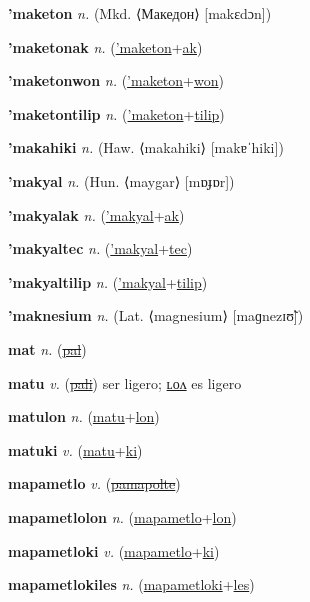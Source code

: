 \textbf{\hypertarget{'maketon}{'maketon}} \textit{n.} (Mkd. ⟨Македон⟩ [makɛdɔn])


\textbf{\hypertarget{'maketonak}{'maketonak}} \textit{n.} (\hyperlink{'maketon}{'maketon}+\allowbreak \hyperlink{ak}{ak})


\textbf{\hypertarget{'maketonwon}{'maketonwon}} \textit{n.} (\hyperlink{'maketon}{'maketon}+\allowbreak \hyperlink{won}{won})


\textbf{\hypertarget{'maketontilip}{'maketontilip}} \textit{n.} (\hyperlink{'maketon}{'maketon}+\allowbreak \hyperlink{tilip}{tilip})


\textbf{\hypertarget{'makahiki}{'makahiki}} \textit{n.} (Haw. ⟨makahiki⟩ [makɐˈhiki])


\textbf{\hypertarget{'makyal}{'makyal}} \textit{n.} (Hun. ⟨maygar⟩ [mɒɟɒr])


\textbf{\hypertarget{'makyalak}{'makyalak}} \textit{n.} (\hyperlink{'makyal}{'makyal}+\allowbreak \hyperlink{ak}{ak})


\textbf{\hypertarget{'makyaltec}{'makyaltec}} \textit{n.} (\hyperlink{'makyal}{'makyal}+\allowbreak \hyperlink{tec}{tec})


\textbf{\hypertarget{'makyaltilip}{'makyaltilip}} \textit{n.} (\hyperlink{'makyal}{'makyal}+\allowbreak \hyperlink{tilip}{tilip})


\textbf{\hypertarget{'maknesium}{'maknesium}} \textit{n.} (Lat. ⟨magnesium⟩ [maɡnezɪʊ̃])


\textbf{\hypertarget{mat}{mat}} \textit{n.} (\hyperlink{pal}{\sout{pal}})


\textbf{\hypertarget{matu}{matu}} \textit{v.} (\hyperlink{pali}{\sout{pali}})
ser ligero; \hyperlink{matulon}{ʟᴏᴧ} es ligero

\textbf{\hypertarget{matulon}{matulon}} \textit{n.} (\hyperlink{matu}{matu}+\allowbreak \hyperlink{lon}{lon})


\textbf{\hypertarget{matuki}{matuki}} \textit{v.} (\hyperlink{matu}{matu}+\allowbreak \hyperlink{ki}{ki})


\textbf{\hypertarget{mapametlo}{mapametlo}} \textit{v.} (\hyperlink{pamapolte}{\sout{pamapolte}})


\textbf{\hypertarget{mapametlolon}{mapametlolon}} \textit{n.} (\hyperlink{mapametlo}{mapametlo}+\allowbreak \hyperlink{lon}{lon})


\textbf{\hypertarget{mapametloki}{mapametloki}} \textit{v.} (\hyperlink{mapametlo}{mapametlo}+\allowbreak \hyperlink{ki}{ki})


\textbf{\hypertarget{mapametlokiles}{mapametlokiles}} \textit{n.} (\hyperlink{mapametloki}{mapametloki}+\allowbreak \hyperlink{les}{les})


